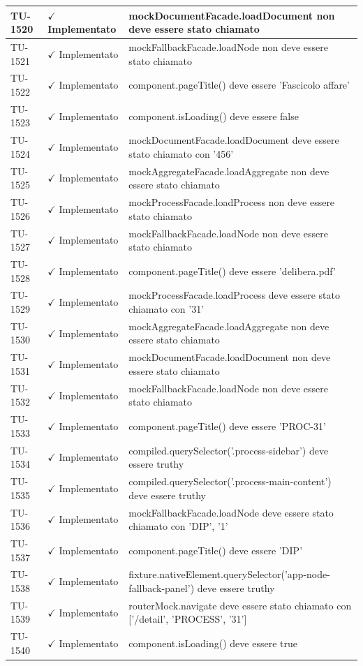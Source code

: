﻿\documentclass[a4paper,12pt]{article}
\newcommand{\ok}{\textcolor{green!60!black}{$\checkmark$ Implementato}}
\begin{document}
\begin{longtable}{|p{2cm}|p{3.5cm}|p{9.5cm}|}
\hline
TU-1520 & \ok & mockDocumentFacade.loadDocument non deve essere stato chiamato \\
\hline
TU-1521 & \ok & mockFallbackFacade.loadNode non deve essere stato chiamato \\
\hline
TU-1522 & \ok & component.pageTitle() deve essere 'Fascicolo affare' \\
\hline
TU-1523 & \ok & component.isLoading() deve essere false \\
\hline
TU-1524 & \ok & mockDocumentFacade.loadDocument deve essere stato chiamato con '456' \\
\hline
TU-1525 & \ok & mockAggregateFacade.loadAggregate non deve essere stato chiamato \\
\hline
TU-1526 & \ok & mockProcessFacade.loadProcess non deve essere stato chiamato \\
\hline
TU-1527 & \ok & mockFallbackFacade.loadNode non deve essere stato chiamato \\
\hline
TU-1528 & \ok & component.pageTitle() deve essere 'delibera.pdf' \\
\hline
TU-1529 & \ok & mockProcessFacade.loadProcess deve essere stato chiamato con '31' \\
\hline
TU-1530 & \ok & mockAggregateFacade.loadAggregate non deve essere stato chiamato \\
\hline
TU-1531 & \ok & mockDocumentFacade.loadDocument non deve essere stato chiamato \\
\hline
TU-1532 & \ok & mockFallbackFacade.loadNode non deve essere stato chiamato \\
\hline
TU-1533 & \ok & component.pageTitle() deve essere 'PROC-31' \\
\hline
TU-1534 & \ok & compiled.querySelector('.process-sidebar') deve essere truthy \\
\hline
TU-1535 & \ok & compiled.querySelector('.process-main-content') deve essere truthy \\
\hline
TU-1536 & \ok & mockFallbackFacade.loadNode deve essere stato chiamato con 'DIP', '1' \\
\hline
TU-1537 & \ok & component.pageTitle() deve essere 'DIP' \\
\hline
TU-1538 & \ok & fixture.nativeElement.querySelector('app-node-fallback-panel') deve essere truthy \\
\hline
TU-1539 & \ok & routerMock.navigate deve essere stato chiamato con ['/detail', 'PROCESS', '31'] \\
\hline
TU-1540 & \ok & component.isLoading() deve essere true \\

\end{longtable}
\end{document}
